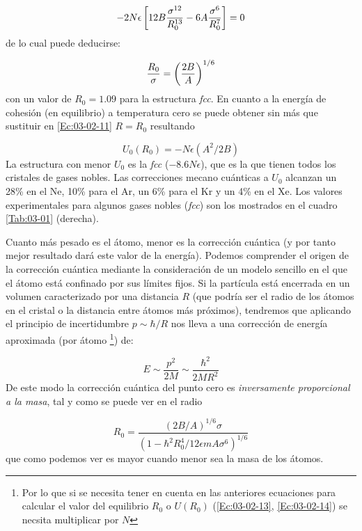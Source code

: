 \begin{equation}
	-2N\epsilon \left[  12 B \frac{\sigma^{12}}{R_0^{13}} - 6 A \frac{\sigma^6}{R_0^7} \right] = 0 \label{Ec:03-02-12}
\end{equation}	
de lo cual puede deducirse:

\begin{equation}
	\frac{R_0}{\sigma} =  \left( \frac{2B}{A} \right)^{1/6} \label{Ec:03-02-13}
\end{equation}
con un valor de $R_0=1.09$ para la estructura \textit{fcc}. En cuanto a la energía de cohesión (en equilibrio) a temperatura cero se puede obtener sin más que sustituir en \ref{Ec:03-02-11} $R=R_0$ resultando

\begin{equation}
	U_0 (R_0) = - N\epsilon (A^2/2B) \label{Ec:03-02-14}
\end{equation}
La estructura con menor $U_0$ es la \textit{fcc} ($-8.6 N\epsilon$), que es la que tienen todos los cristales de gases nobles. Las correcciones mecano cuánticas a $U_0$ alcanzan un 28\% en el Ne, 10\% para el Ar, un 6\% para el Kr y un  4\% en el Xe. Los valores experimentales para algunos gases nobles (\textit{fcc}) son los mostrados en el cuadro \ref{Tab:03-01} (derecha).

Cuanto más pesado es el átomo, menor es la corrección cuántica (y por tanto mejor resultado dará este valor de la energía). Podemos comprender el origen de la corrección cuántica mediante la consideración de un modelo sencillo en el que el átomo está confinado por sus límites fijos. Si la partícula está encerrada en un volumen caracterizado por una distancia $R$ (que podría ser el radio de los átomos en el cristal o la distancia entre átomos más próximos), tendremos que aplicando el principio de incertidumbre $p\sim \hbar /R$ nos lleva a una corrección de energía aproximada (por átomo \footnote{Por lo que si se necesita tener en cuenta en las anteriores ecuaciones para calcular el valor del equilibrio  $R_0$ o $U(R_0)$ (\ref{Ec:03-02-13}, \ref{Ec:03-02-14}) se necsita multiplicar por $N$}) de:

\begin{equation*}
	E \sim \frac{p^2}{2M} \sim \frac{\hbar^2}{2M R^2} 
\end{equation*} 
De este modo la corrección cuántica del punto cero es \textit{inversamente proporcional a la masa}, tal y como se puede ver en el radio

\begin{equation}
	R_0 = \frac{(2B/A)^{1/6} \sigma}{(1-\hbar^2 R_0^4 / 12\epsilon m A \sigma^6)^{1/6}}
\end{equation}
que como podemos ver es mayor cuando menor sea la masa de los átomos. \\

